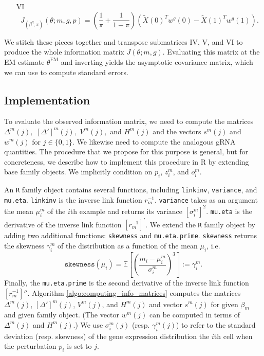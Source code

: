 \documentclass[12pt]{article}
\begin{document}
\begin{appendices}
\begin{refsection}
\begin{itemize}
			\item[VI] $$ J_{(\beta^g, \pi)}(\theta; m, g, p) = \left(\frac{1}{\pi} + \frac{1}{1 - \pi} \right) \left( \tilde{X}(0)^T w^g(0) - \tilde{X}(1)^T w^g(1)\right).$$
		\end{itemize}
		We stitch these pieces together and transpose submatrices IV, V, and VI to produce the whole information matrix $J(\theta; m, g)$. Evaluating this matrix at the EM estimate $\theta^\textrm{EM}$ and inverting yields the asymptotic covariance matrix, which we can use to compute standard errors.
		
		\subsection{Implementation}
		To evaluate the observed information matrix, we need to compute the matrices $\Delta^m(j),$ $[\Delta']^m(j),$ $V^m(j),$ and $H^m(j)$ and the vectors $s^m(j)$ and $w^m(j)$ for $j \in \{0,1\}$. We likewise need to compute the analogous gRNA quantities. The procedure that we propose for this purpose is general, but for concreteness, we describe how to implement this procedure in R by extending base family objects. We implicitly condition on $p_i$, $z^m_i$, and $o^m_i$.
		
		An \texttt{R} family object contains several functions, including \texttt{linkinv}, \texttt{variance}, and \texttt{mu.eta}. \texttt{linkinv} is the inverse link function $r_m^{-1}$. \texttt{variance} takes as an argument the mean $\mu^m_i$ of the $i$th example and returns its variance $[\sigma_i^m]^2$. \texttt{mu.eta} is the derivative of the inverse link function $[r^{-1}_m]^{'}$. We extend the \texttt{R} family object by adding two additional functions: \texttt{skewness} and \texttt{mu.eta.prime}. \texttt{skewness} returns the skewness $\gamma^m_i$ of the distribution as a function of the mean $\mu_i$, i.e. $$\texttt{skewness}\left(\mu_i\right) = \mathbb{E} \left[\left(\frac{m_i - \mu_i^m}{ \sigma_i^m}\right)^3\right] := \gamma_i^m.$$ Finally, the \texttt{mu.eta.prime} is the second derivative of the inverse link function $[r^{-1}_m]''.$ Algorithm \ref{algo:computing_info_matrices} computes the matrices $\Delta^m(j)$, $[\Delta']^m(j)$, $V^m(j)$, and $H^m(j)$ and vector $s^m(j)$ for given $\beta_m$ and given family object. (The vector $w^m(j)$ can be computed in terms of $\Delta^m(j)$ and $H^m(j)$.) We use $\sigma^m_i(j)$ (resp. $\gamma^m_i(j)$) to refer to the standard deviation (resp. skewness) of the gene expression distribution the $i$th cell when the perturbation $p_i$ is set to $j$.
		

\end{refsection}
\end{appendices}
\end{document}

